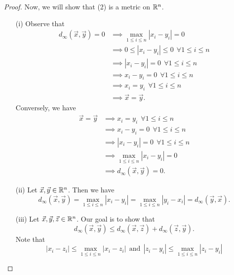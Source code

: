 \documentclass[a4paper]{article}
\begin{document}
\begin{proof}
Now, we will show that (2) is a metric on \( \mathbb{R}^{n} \).
\begin{enumerate}
    \item[(i)] Observe that 
        \begin{align*}
            {d}_{\infty }(\vec{ x } , \vec{ y } ) = 0 &\implies \max_{1 \leq i \leq n } | {x}_{i} - {y}_{i} | = 0  \\
                                                      &\implies 0 \leq | {x}_{i} - {y}_{i} |  \leq 0 \ \  \forall 1 \leq i \leq n \\
                                                      &\implies | {x}_{i} - {y}_{i} |  = 0 \ \ \forall 1 \leq i \leq n \\
                                                      &\implies {x}_{i} - {y}_{i} = 0 \ \ \forall 1 \leq i \leq n \\
                                                      &\implies {x}_{i} = {y}_{i} \ \ \forall 1 \leq i \leq n \\
                                                      &\implies \vec{ x }  = \vec{ y }. 
        \end{align*}
        Conversely, we have  
        \begin{align*}
            \vec{ x }  = \vec{ y } &\implies {x}_{i} = {y}_{i} \ \ \forall 1 \leq i \leq n  \\
                                   &\implies {x}_{i} - {y}_{i} = 0 \ \ \forall 1 \leq i \leq n \\ 
                                   &\implies | {x}_{i} - {y}_{i} | = 0 \ \ \forall 1 \leq i \leq n \\
                                   &\implies \max_{1 \leq i \leq n} | {x}_{i} - {y}_{i} |  = 0 \\
                                   &\implies {d}_{\infty }(\vec{ x }, \vec{ y } ) = 0. 
        \end{align*}
    \item[(ii)] Let \( \vec{ x } , \vec{ y }  \in \mathbb{R}^{n} \). Then we have 
        \[  {d}_{\infty }(\vec{ x } ,\vec{ y } ) = \max_{1 \leq i \leq n} | {x}_{i} - {y}_{i} |  = \max_{1 \leq i \leq n} | {y}_{i} - {x}_{i} |  = {d}_{\infty }(\vec{ y } , \vec{ x } ). \]
    \item[(iii)] Let \( \vec{ x } ,\vec{ y } , \vec{ z }  \in \mathbb{R}^{n} \). Our goal is to show that 
        \[  {d}_{\infty }(\vec{ x } , \vec{ y } ) \leq {d}_{\infty }(\vec{ x } , \vec{ z } ) + {d}_{\infty }(\vec{ z } ,  \vec{ y } ). \]
        Note that 
        \[  | {x}_{i} - {z}_{i} |  \leq \max_{1 \leq i \leq n} | {x}_{i} - {z}_{i} | \ \ \text{and} \ \ | {z}_{i} - {y}_{i} |  \leq \max_{1 \leq i \leq n} | {z}_{i} - {y}_{i} |  \tag{\(\forall 1 \leq i \leq n\)}  \]

\end{enumerate}
\end{proof}
\end{document}
